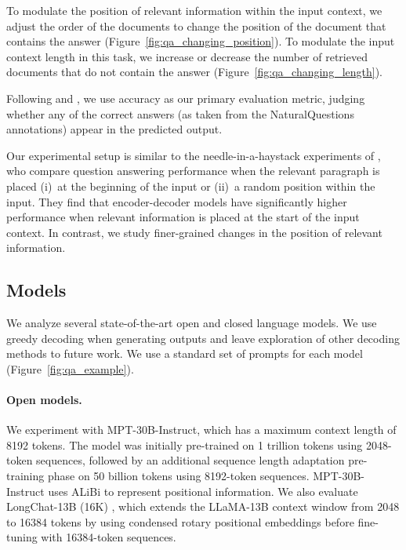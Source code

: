 To modulate the position of relevant information within the input context, we adjust the order of the documents to change the position of the document that contains the answer (Figure~\ref{fig:qa_changing_position}).
To modulate the input context length in this task, we increase or decrease the number of retrieved documents that do not contain the answer (Figure~\ref{fig:qa_changing_length}).

Following \citet{kandpal2022large} and \citet{mallen2023trust}, we use accuracy as our primary evaluation metric, judging whether any of the correct answers (as taken from the NaturalQuestions annotations) appear in the predicted output.

Our experimental setup is similar to the needle-in-a-haystack experiments of \citet{ivgi-etal-2023-efficient}, who compare question answering performance when the relevant paragraph is placed (i)~at the beginning of the input or (ii)~a random position within the input. They find that encoder-decoder models have significantly higher performance when relevant information is placed at the start of the input context. In contrast, we study finer-grained changes in the position of relevant information.

\subsection{Models}\label{sec:models}

We analyze several state-of-the-art open and closed language models. We use greedy decoding when generating outputs and leave exploration of other decoding methods to future work. We use a standard set of prompts for each model (Figure~\ref{fig:qa_example}).

\paragraph{Open models.} We experiment with MPT-30B-Instruct, which has a maximum context length of 8192 tokens. The model was initially pre-trained on 1 trillion tokens using 2048-token sequences, followed by an additional sequence length adaptation pre-training phase on 50 billion tokens using 8192-token sequences. MPT-30B-Instruct uses ALiBi \citep{press2022train} to represent positional information. We also evaluate LongChat-13B (16K) \citep{longchat2023}, which extends the LLaMA-13B \citep{touvron2023llama} context window from 2048 to 16384 tokens by using condensed rotary positional embeddings before fine-tuning with 16384-token sequences.


